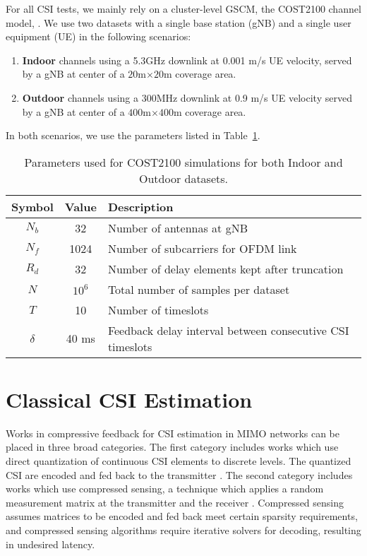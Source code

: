 For all CSI tests, we mainly rely on a cluster-level GSCM, the COST2100 channel model,  \cite{ref:liu2012cost2100}. We use two datasets with a single base station (gNB) and a single user equipment (UE) in the following scenarios:
\begin{enumerate}
	\item \textbf{Indoor} channels using a 5.3GHz downlink at
	0.001 m/s UE velocity, served by a
	gNB at center of a $20$m$\times 20$m coverage area.
	\item \textbf{Outdoor} channels using a 300MHz downlink at 0.9 m/s UE velocity served by a gNB at center 
	of a $400$m$\times 400$m coverage area.
\end{enumerate}
In both scenarios, we use the parameters listed in Table~\ref{tab:cost-params}.
\begin{table}[]
\centering
\caption{Parameters used for COST2100 simulations for both Indoor and Outdoor datasets.}
\label{tab:cost-params}
\begin{tabular}{c|c|l}
\toprule
\textbf{Symbol} & \textbf{Value} & \textbf{Description} \\ \midrule
$N_b$ 			& 32			 & Number of antennas at gNB  \\ \hline
$N_f$ 			& 1024			 & Number of subcarriers for OFDM link  \\ \hline
$R_d$ 			& 32			 & Number of delay elements kept after truncation  \\ \hline
$N$ 			& $10^6$		 & Total number of samples per dataset  \\ \hline
$T$ 			& 10		 	 & Number of timeslots  \\ \hline
$\delta$		& 40 ms			 & Feedback delay interval between consecutive CSI timeslots  \\ \bottomrule
\end{tabular}
\end{table}

\section{Classical CSI Estimation}
\label{sect:classic_estimation}

Works in compressive feedback for CSI estimation in MIMO networks can be placed in three broad categories. The first category includes works which use direct quantization of continuous CSI elements to discrete levels. The quantized CSI are encoded and fed back to the transmitter \cite{ref:makki2012hybrid,ref:shirani2009channel}. The second category includes works which use compressed sensing, a technique which applies a random measurement matrix at the transmitter and the receiver \cite{ref:rao2014distributed, ref:eltayeb2014compressive}. Compressed sensing assumes matrices to be encoded and fed back meet certain sparsity requirements, and compressed sensing algorithms require iterative solvers \cite{ref:do2008sparsity} for decoding, resulting in undesired latency.

